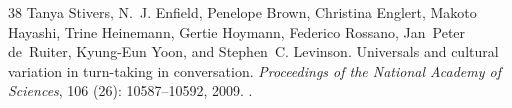 \documentclass[UTF8,fontset=none,a4paper,10pt]{ctexart}
\begin{document}
{\begin{thebibliography}{38}
Tanya Stivers, N.~J. Enfield, Penelope Brown, Christina Englert, Makoto
  Hayashi, Trine Heinemann, Gertie Hoymann, Federico Rossano, Jan~Peter
  de~Ruiter, Kyung-Eun Yoon, and Stephen~C. Levinson.
\newblock Universals and cultural variation in turn-taking in conversation.
\newblock \emph{Proceedings of the National Academy of Sciences}, 106
  (26): 10587--10592, 2009.
\newblock {}.

\end{thebibliography}
}
\end{document}
